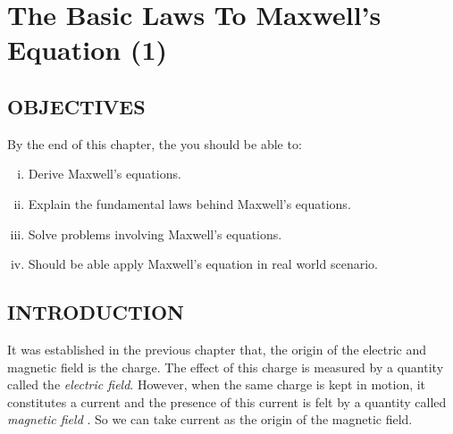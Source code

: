 \chapter{The Basic Laws To Maxwell's Equation (1)}\label{lec:lec18}

\section{OBJECTIVES}
\begin{mdframed}[backgroundcolor=lightblue, linewidth=1pt, hidealllines=true]
	By the end of this chapter, the you should be able to:
	\begin{enumerate}[(i)]
		\item Derive Maxwell's equations. 
		
		\item Explain the fundamental laws behind Maxwell's equations.
		
		\item Solve problems involving Maxwell's equations.
		
		\item Should be able apply Maxwell's equation in real world scenario.
	\end{enumerate}
\end{mdframed}	

\section{INTRODUCTION}
It was established in the previous chapter that, the origin of the electric and magnetic field is the charge. The effect of this charge is measured by a quantity called the \emph{electric field}. However, when the same charge is kept in motion, it constitutes a current and the presence of this current is felt by a quantity called \emph{magnetic field} . So we can take current as the origin of the magnetic field. 

